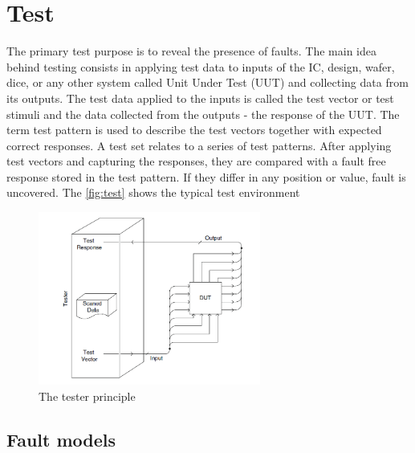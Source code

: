 \chapter{Test}
The primary test purpose is to reveal the presence of faults. The main idea behind testing consists in applying test data to inputs of the IC, design, wafer, dice, or any other system called Unit Under Test (UUT) and collecting data from its outputs. The test data applied to the inputs is called the test vector or test stimuli and the data collected from the outputs - the response of the UUT. The term test pattern is used to describe the test vectors together with expected correct responses. A test set relates to a series of test patterns. After applying test vectors and capturing the responses, they are compared with a fault free response stored in the test pattern. If they differ in any position or value, fault is uncovered. The \autoref{fig:test} shows the typical test environment

\begin{figure}[H]
\centering
\includegraphics[width=0.65\textwidth]{figures/test.png}
\caption{The tester principle~\cite{book:Navabi}}
\label{fig:test}
\end{figure}


\section{Fault models}

